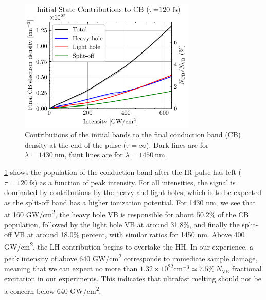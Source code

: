 \begin{figure}
	\centering
	\includegraphics[width=0.75\textwidth]{figures/chap4/CB_dens_vs_Int.pdf}
	\caption{Contributions of the initial bands to the final conduction band (CB) density at the end of the pulse ($\tau = \infty$). Dark lines are for $\lambda = 1430 \ \textrm{nm}$, faint lines are for $\lambda = 1450 \ \textrm{nm}$.}
	\label{fig:CB_dens_vs_Int}
\end{figure}

\cref{fig:CB_dens_vs_Int} shows the population of the conduction band after the IR pulse has left (${\tau = 120 \ \textrm{fs}}$) as a function of peak intensity. For all intensities, the signal is dominated by contributions by the heavy and light holes, which is to be expected as the split-off band has a higher ionization potential. For 1430 nm, we see that at 160 GW/cm\textsuperscript{2}, the heavy hole VB is responsible for about 50.2\% of the CB population, followed by the light hole VB at around 31.8\%, and finally the split-off VB at around 18.0\% percent, with similar ratios for 1450 nm. Above 400 GW/cm\textsuperscript{2}, the LH contribution begins to overtake the HH. In our experience, a peak intensity of above 640 GW/cm\textsuperscript{2} corresponds to immediate sample damage, meaning that we can expect no more than $1.32 \times 10^{22} \textrm{cm}^{-3} \simeq 7.5\% \ N_{\textrm{VB}}$ fractional excitation in our experiments. This indicates that ultrafast melting should not be a concern below 640 GW/cm\textsuperscript{2}.

